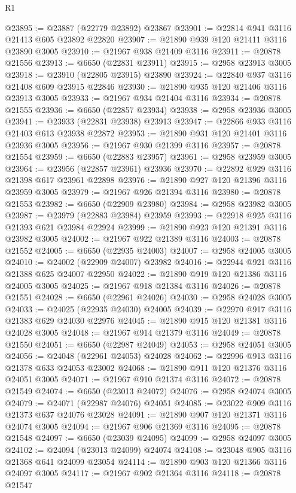 \begin{lexlean}{R1}
\begin{coremodule}
@23895 := @23887 (@22779 @23892) @23867
@23901 := @22814 @941 @3116 @21413 @605 @23892 @22820
@23907 := @21890 @939 @120 @21411 @3116 @23890 @3005
@23910 := @21967 @938 @21409 @3116
@23911 := @20878 @21556
@23913 := @6650 (@22831 @23911)
@23915 := @2958 @23913 @3005
@23918 := @23910 (@22805 @23915) @23890
@23924 := @22840 @937 @3116 @21408 @609 @23915 @22846
@23930 := @21890 @935 @120 @21406 @3116 @23913 @3005
@23933 := @21967 @934 @21404 @3116
@23934 := @20878 @21555
@23936 := @6650 (@22857 @23934)
@23938 := @2958 @23936 @3005
@23941 := @23933 (@22831 @23938) @23913
@23947 := @22866 @933 @3116 @21403 @613 @23938 @22872
@23953 := @21890 @931 @120 @21401 @3116 @23936 @3005
@23956 := @21967 @930 @21399 @3116
@23957 := @20878 @21554
@23959 := @6650 (@22883 @23957)
@23961 := @2958 @23959 @3005
@23964 := @23956 (@22857 @23961) @23936
@23970 := @22892 @929 @3116 @21398 @617 @23961 @22898
@23976 := @21890 @927 @120 @21396 @3116 @23959 @3005
@23979 := @21967 @926 @21394 @3116
@23980 := @20878 @21553
@23982 := @6650 (@22909 @23980)
@23984 := @2958 @23982 @3005
@23987 := @23979 (@22883 @23984) @23959
@23993 := @22918 @925 @3116 @21393 @621 @23984 @22924
@23999 := @21890 @923 @120 @21391 @3116 @23982 @3005
@24002 := @21967 @922 @21389 @3116
@24003 := @20878 @21552
@24005 := @6650 (@22935 @24003)
@24007 := @2958 @24005 @3005
@24010 := @24002 (@22909 @24007) @23982
@24016 := @22944 @921 @3116 @21388 @625 @24007 @22950
@24022 := @21890 @919 @120 @21386 @3116 @24005 @3005
@24025 := @21967 @918 @21384 @3116
@24026 := @20878 @21551
@24028 := @6650 (@22961 @24026)
@24030 := @2958 @24028 @3005
@24033 := @24025 (@22935 @24030) @24005
@24039 := @22970 @917 @3116 @21383 @629 @24030 @22976
@24045 := @21890 @915 @120 @21381 @3116 @24028 @3005
@24048 := @21967 @914 @21379 @3116
@24049 := @20878 @21550
@24051 := @6650 (@22987 @24049)
@24053 := @2958 @24051 @3005
@24056 := @24048 (@22961 @24053) @24028
@24062 := @22996 @913 @3116 @21378 @633 @24053 @23002
@24068 := @21890 @911 @120 @21376 @3116 @24051 @3005
@24071 := @21967 @910 @21374 @3116
@24072 := @20878 @21549
@24074 := @6650 (@23013 @24072)
@24076 := @2958 @24074 @3005
@24079 := @24071 (@22987 @24076) @24051
@24085 := @23022 @909 @3116 @21373 @637 @24076 @23028
@24091 := @21890 @907 @120 @21371 @3116 @24074 @3005
@24094 := @21967 @906 @21369 @3116
@24095 := @20878 @21548
@24097 := @6650 (@23039 @24095)
@24099 := @2958 @24097 @3005
@24102 := @24094 (@23013 @24099) @24074
@24108 := @23048 @905 @3116 @21368 @641 @24099 @23054
@24114 := @21890 @903 @120 @21366 @3116 @24097 @3005
@24117 := @21967 @902 @21364 @3116
@24118 := @20878 @21547

\end{coremodule}
\end{lexlean}

